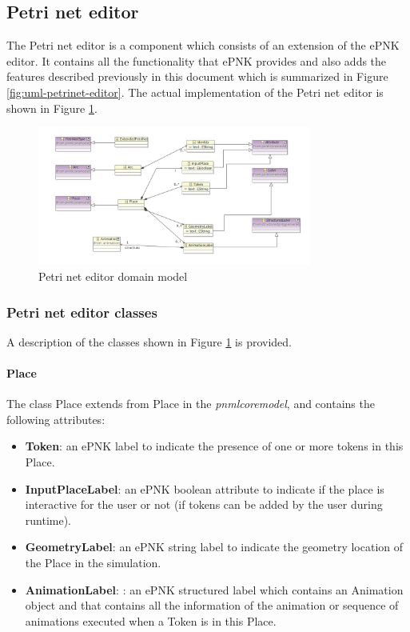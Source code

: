 \subsection{Petri net editor}

The Petri net editor is a component which consists of an extension of the ePNK editor. It contains all the functionality that ePNK provides and also adds the features described previously in this document which is summarized in Figure \ref{fig:uml-petrinet-editor}. The actual implementation of the Petri net editor is shown in Figure \ref{fig:petri-net-domain-model}.

\begin{figure}[htp]
\begin{center}
  \includegraphics[width=0.8\textwidth]{image/petrinet_editor_domain.png}
  \caption{Petri net editor domain model}
  \label{fig:petri-net-domain-model}
\end{center}
\end{figure}

\subsubsection{Petri net editor classes}

A description of the classes shown in Figure \ref{fig:petri-net-domain-model} is provided.

\paragraph{Place}

The class Place extends from Place in the \textit{pnmlcoremodel}, and contains the following attributes:

\begin{itemize}
	\item \textbf{Token}: an ePNK label to indicate the presence of one or more tokens in this Place.
	\item \textbf{InputPlaceLabel}: an ePNK boolean attribute to indicate if the place is interactive for the user or not (if tokens can be added by the user during runtime).
	\item \textbf{GeometryLabel}: an ePNK string label to indicate the geometry location of the Place in the simulation.
	\item \textbf{AnimationLabel}: : an ePNK structured label which contains an Animation object and that contains all the information of the animation or sequence of animations executed when a Token is in this Place.
\end{itemize}

